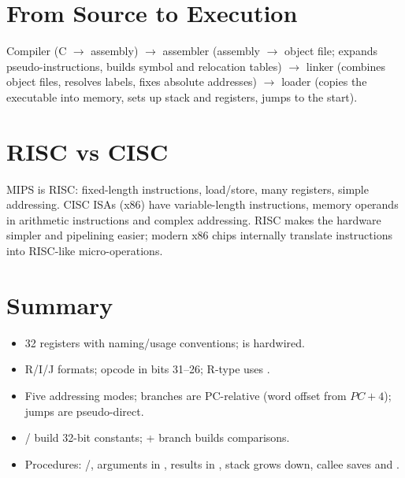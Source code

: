 \section{From Source to Execution}

Compiler (C $\to$ assembly) $\to$ assembler (assembly $\to$ object file;
expands pseudo-instructions, builds symbol and relocation tables)
$\to$ linker (combines object files, resolves labels, fixes absolute
addresses) $\to$ loader (copies the executable into memory, sets up stack
and registers, jumps to the start).

\section{RISC vs CISC}

MIPS is RISC: fixed-length instructions, load/store, many registers, simple
addressing. CISC ISAs (x86) have variable-length instructions, memory
operands in arithmetic instructions and complex addressing. RISC makes the
hardware simpler and pipelining easier; modern x86 chips internally
translate instructions into RISC-like micro-operations.

\section*{Summary}
\begin{itemize}
  \item 32 registers with naming/usage conventions;  is
    hardwired.
  \item R/I/J formats; opcode in bits 31--26; R-type uses .
  \item Five addressing modes; branches are PC-relative (word offset from
    $PC+4$); jumps are pseudo-direct.
  \item {}/ build 32-bit constants;  + branch
    builds comparisons.
  \item Procedures: /, arguments in
    , results in , stack grows down, callee saves
     and .
\end{itemize}

